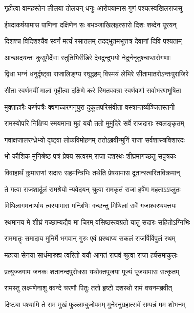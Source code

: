\twolineshloka
{गृहीत्वा वामहस्तेन लीलया तोलयन् धनुः}
{आरोपयामास गुणं पश्यत्स्वखिलराजसु} %

\twolineshloka
{ईषदाकर्षयामास पाणिना दक्षिणेन सः}
{बभञ्जाखिलहृत्सारो दिशः शब्देन पूरयन्} %

\twolineshloka
{दिशश्च विदिशश्चैव स्वर्गं मर्त्यं रसातलम्}
{तदद्भुतमभूत्तत्र देवानां दिवि पश्यताम्} %

\twolineshloka
{आच्छादयन्तः कुसुमैर्देवाः स्तुतिभिरीडिरे}
{देवदुन्दुभयो नेदुर्ननृतुश्चाप्सरोगणाः} %

\twolineshloka
{द्विधा भग्नं धनुर्दृष्ट्वा राजालिङ्ग्य रघूद्वहम्}
{विस्मयं लेभिरे सीतामातरोऽन्तःपुराजिरे} %

\twolineshloka
{सीता स्वर्णमयीं मालां गृहीत्वा दक्षिणे करे}
{स्मितवक्त्रा स्वर्णवर्णा सर्वाभरणभूषिता} %

\twolineshloka
{मुक्ताहारैः कर्णपत्रैः क्वणच्चरणनूपुरा}
{दुकूलपरिसंवीता वस्त्रान्तर्व्यञ्जितस्तनी} %

\twolineshloka
{रामस्योपरि निक्षिप्य स्मयमाना मुदं ययौ}
{ततो मुमुदिरे सर्वे राजदाराः स्वलङ्कृतम्} %

\twolineshloka
{गवाक्षजालरन्ध्रेभ्यो दृष्ट्वा लोकविमोहनम्}
{ततोऽब्रवीन्मुनिं राजा सर्वशास्त्रविशारदः} %

\twolineshloka
{भो कौशिक मुनिश्रेष्ठ पत्रं प्रेषय सत्वरम्}
{राजा दशरथः शीघ्रमागच्छतु सपुत्रकः} %

\twolineshloka
{विवाहार्थं कुमाराणां सदारः सहमन्त्रिभिः}
{तथेति प्रेषयामास दूतान्स्त्वरितविक्रमान्} %

\twolineshloka
{ते गत्वा राजशार्दूलं रामश्रेयो न्यवेदयन्}
{श्रुत्वा रामकृतं राजा हर्षेण महताऽऽप्लुतः} %

\twolineshloka
{मिथिलागमनार्थाय त्वरयामास मन्त्रिभिः}
{गच्छन्तु मिथिलां सर्वे गजाश्वरथपत्तयः} %

\twolineshloka
{रथमानय मे शीघ्रं गच्छाम्यद्यैव मा चिरम्}
{वसिष्ठस्त्वग्रतो यातु सदारः सहितोऽग्निभिः} %

\twolineshloka
{राममातॄः समादाय मुनिर्मे भगवान् गुरुः}
{एवं प्रस्थाप्य सकलं राजर्षिर्विपुलं रथम्} %

\twolineshloka
{महत्या सेनया सार्धमारुह्य त्वरितो ययौ}
{आगतं राघवं श्रुत्वा राजा हर्षसमाकुलः} %

\twolineshloka
{प्रत्युज्जगाम जनकः शतानन्दपुरोधसा}
{यथोक्तपूजया पूज्यं पूजयामास सत्कृतम्} %

\twolineshloka
{रामस्तु लक्ष्मणेनाशु ववन्दे चरणौ पितुः}
{ततो हृष्टो दशरथो रामं वचनमब्रवीत्} %

\twolineshloka
{दिष्ट्या पश्यामि ते राम मुखं फुल्लाम्बुजोपमम्}
{मुनेरनुग्रहात्सर्वं सम्पन्नं मम शोभनम्} %


